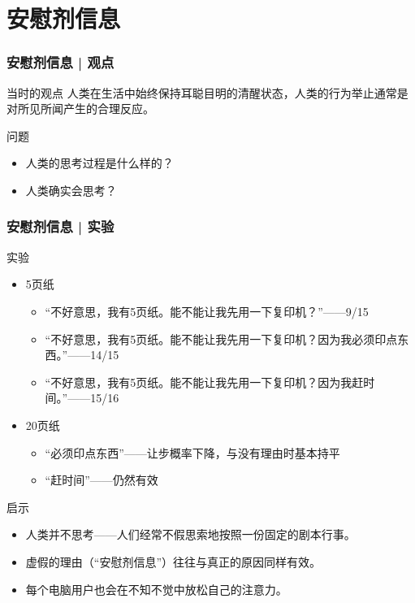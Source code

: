 \section{安慰剂信息}
\begin{frame}
  \frametitle{安慰剂信息 | 观点}
  \begin{block}{当时的观点}
    人类在生活中始终保持耳聪目明的清醒状态，人类的行为举止通常是对所见所闻产生的合理反应。
  \end{block}
  \pause
  \begin{block}{问题}
    \begin{itemize}
      \item 人类的思考过程是什么样的？
      \item 人类确实会思考？
    \end{itemize}
  \end{block}
\end{frame}

\begin{frame}
  \frametitle{安慰剂信息 | 实验}
  \begin{block}{实验}
    \begin{itemize}
      \item 5页纸
    \begin{itemize}
      \item “不好意思，我有5页纸。能不能让我先用一下复印机？”——9/15
      \item “不好意思，我有5页纸。能不能让我先用一下复印机？因为我必须印点东西。”——14/15
      \item “不好意思，我有5页纸。能不能让我先用一下复印机？因为我赶时间。”——15/16
    \end{itemize}
      \item 20页纸
        \begin{itemize}
          \item “必须印点东西”——让步概率下降，与没有理由时基本持平
          \item “赶时间”——仍然有效
        \end{itemize}
    \end{itemize}
  \end{block}
  \pause
  \begin{block}{启示}
    \begin{itemize}
      \item 人类并不思考——人们经常不假思索地按照一份固定的剧本行事。
      \item 虚假的理由（“安慰剂信息”）往往与真正的原因同样有效。
      \item 每个电脑用户也会在不知不觉中放松自己的注意力。
    \end{itemize}
  \end{block}
\end{frame}

